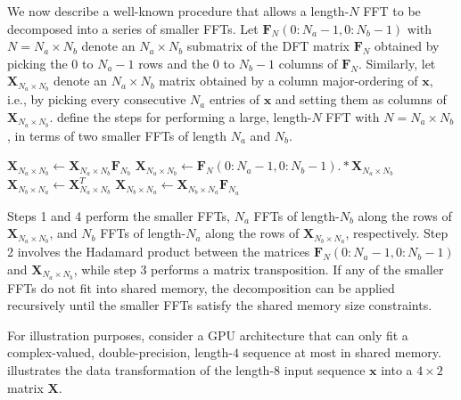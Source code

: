 \documentclass[11pt, onecolumn, journal,compsoc]{IEEEtran}
\theoremstyle{problemstyle}
\begin{document}
We now describe a well-known procedure that allows a length-$N$ FFT to be decomposed into a series of smaller FFTs. Let $\bm{F}_N (0 \colon N_a-1, 0 \colon N_b-1)$ with $N = N_a \times N_b$ denote an $N_a \times N_b$ submatrix of the DFT matrix $\bm{F}_N$ obtained by picking the $0$ to $N_a-1$ rows and the $0$ to $N_b-1$ columns of $\bm{F}_N$. Similarly, let $\bm{X}_{N_a \times N_b}$ denote an $N_a \times N_b$ matrix obtained by a column major-ordering of $\bm{x}$, i.e., by picking every consecutive $N_a$ entries of $\bm{x}$ and setting them as columns of $\bm{X}_{N_a \times N_b}$.  define the steps for performing a large, length-$N$ FFT with $N = N_a \times N_b$, in terms of two smaller FFTs of length $N_a$ and $N_b$.
\begin{algorithm}
\begin{algorithmic}[1]
\State $\bm{X}_{N_a \times N_b} \gets \bm{X}_{N_a \times N_b} \bm{F}_{N_b}$ 
\State $\bm{X}_{N_a \times N_b} \gets \bm{F}_N (0 \colon N_a-1, 0 \colon N_b-1) .* \bm{X}_{N_a \times N_b}$ 
\State $\bm{X}_{N_b \times N_a} \gets \bm{X}_{N_a \times N_b}^{T}$
\State $\bm{X}_{N_b \times N_a} \gets \bm{X}_{N_b \times N_a} \bm{F}_{N_a}$ 
\end{algorithmic}
\caption{4-Step FFT Algorithm \cite{bailey89}}
\label{alg:4_step_fft}
\end{algorithm}
Steps 1 and 4 perform the smaller FFTs, $N_a$ FFTs of length-$N_b$ along the rows of $\bm{X}_{N_a \times N_b}$, and $N_b$ FFTs of length-$N_a$ along the rows of $\bm{X}_{N_b \times N_a}$, respectively. Step 2 involves the Hadamard product between the matrices $\bm{F}_N (0 \colon N_a-1, 0 \colon N_b-1)$ and $\bm{X}_{N_a \times N_b}$, while step 3 performs a matrix transposition. If any of the smaller FFTs do not fit into shared memory, the decomposition can be applied recursively until the smaller FFTs satisfy the shared memory size constraints. 

For illustration purposes, consider a GPU architecture that can only fit a complex-valued, double-precision, length-$4$ sequence at most in shared memory.  illustrates the data transformation of the length-$8$ input sequence $\bm{x}$ into a $4 \times 2$ matrix $\bm{X}$. 
\end{document}
